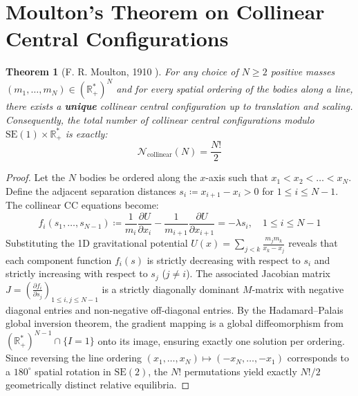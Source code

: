 \documentclass[11pt,a4paper]{article}
\newtheorem{theorem}{Theorem}[section]
\theoremstyle{definition}
\begin{document}
\section{Moulton's Theorem on Collinear Central Configurations}

\begin{theorem}[F. R. Moulton, 1910 \cite{moulton1910}]\label{thm:moulton}
For any choice of $N \ge 2$ positive masses $(m_1, \dots, m_N) \in (\mathbb{R}_+^*)^N$ and for every spatial ordering of the bodies along a line, there exists a \textbf{unique} collinear central configuration up to translation and scaling.
Consequently, the total number of collinear central configurations modulo $\mathrm{SE}(1) \times \mathbb{R}_+^*$ is exactly:
\begin{equation}\label{eq:moulton_count}
\mathcal{N}_{\text{collinear}}(N) = \frac{N!}{2}
\end{equation}
\end{theorem}

\begin{proof}
Let the $N$ bodies be ordered along the $x$-axis such that $x_1 < x_2 < \dots < x_N$.
Define the adjacent separation distances $s_i \coloneqq x_{i+1} - x_i > 0$ for $1 \le i \le N-1$.
The collinear CC equations become:
\begin{equation}\label{eq:collinear_diff}
f_i(s_1, \dots, s_{N-1}) \coloneqq \frac{1}{m_i} \frac{\partial U}{\partial x_i} - \frac{1}{m_{i+1}} \frac{\partial U}{\partial x_{i+1}} = -\lambda s_i, \quad 1 \le i \le N-1
\end{equation}
Substituting the 1D gravitational potential $U(x) = \sum_{j < k} \frac{m_j m_k}{x_k - x_j}$ reveals that each component function $f_i(s)$ is strictly decreasing with respect to $s_i$ and strictly increasing with respect to $s_j$ ($j \ne i$).
The associated Jacobian matrix $J = \left( \frac{\partial f_i}{\partial s_j} \right)_{1 \le i, j \le N-1}$ is a strictly diagonally dominant $M$-matrix with negative diagonal entries and non-negative off-diagonal entries.
By the Hadamard--Palais global inversion theorem, the gradient mapping is a global diffeomorphism from $(\mathbb{R}_+^*)^{N-1} \cap \{I = 1\}$ onto its image, ensuring exactly one solution per ordering.
Since reversing the line ordering $(x_1, \dots, x_N) \mapsto (-x_N, \dots, -x_1)$ corresponds to a $180^\circ$ spatial rotation in $\mathrm{SE}(2)$, the $N!$ permutations yield exactly $N!/2$ geometrically distinct relative equilibria.
\end{proof}
\end{document}
